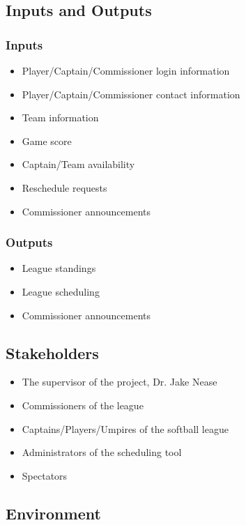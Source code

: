 \documentclass{article}
\begin{document}
\subsection{Inputs and Outputs}

\subsubsection{Inputs}

\begin{itemize}
    \item Player/Captain/Commissioner login information
    \item Player/Captain/Commissioner contact information
    \item Team information
    \item Game score
    \item Captain/Team availability
    \item Reschedule requests
    \item Commissioner announcements
\end{itemize}

\subsubsection{Outputs}

\begin{itemize}
    \item League standings
    \item League scheduling
    \item Commissioner announcements
\end{itemize}

\subsection{Stakeholders}

\begin{itemize}
    \item The supervisor of the project, Dr. Jake Nease
    \item Commissioners of the league
    \item Captains/Players/Umpires of the softball league
    \item Administrators of the scheduling tool
    \item Spectators
\end{itemize}

\subsection{Environment}
\end{document}
